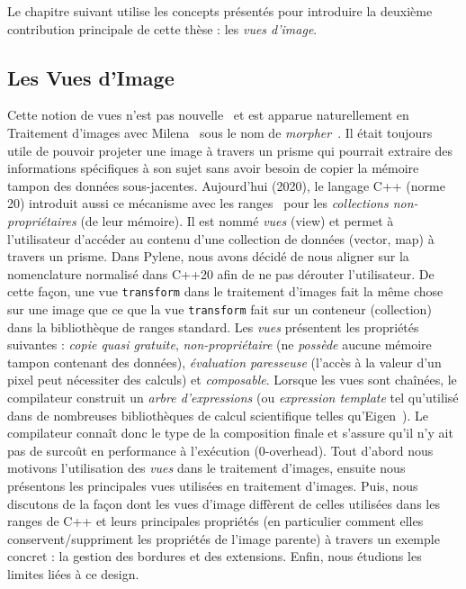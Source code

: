 Le chapitre suivant utilise les concepts présentés pour introduire la deuxième contribution principale de cette thèse :
les \emph{vues d'image}.


\subsection*{Les Vues d'Image}


Cette notion de vues n'est pas nouvelle~\parencite{novak.1997.reuse} et est apparue naturellement en Traitement d'images
avec Milena~\parencite{geraud.2012.ipolmeeting,levillain.2010.icip} sous le nom de
\emph{morpher}~\parencite{levillain.2009.ismm, geraud.2012.hdr}. Il était toujours utile de pouvoir projeter une image à
travers un prisme qui pourrait extraire des informations spécifiques à son sujet sans avoir besoin de copier la mémoire
tampon des données sous-jacentes. Aujourd'hui (2020), le langage C++ (norme 20) introduit aussi ce mécanisme avec les
ranges~\parencite{niebler.2014.ranges} pour les \emph{collections non-propriétaires} (de leur mémoire). Il est nommé
\emph{vues} (view) et permet à l'utilisateur d'accéder au contenu d'une collection de données (vector, map) à travers un
prisme. Dans Pylene, nous avons décidé de nous aligner sur la nomenclature normalisé dans C++20 afin de ne pas dérouter
l'utilisateur. De cette façon, une vue \texttt{transform} dans le traitement d'images fait la même chose sur une image
que ce que la vue \texttt{transform} fait sur un conteneur (collection) dans la bibliothèque de ranges standard. Les
\emph{vues} présentent les propriétés suivantes : \emph{copie quasi gratuite}, \emph{non-propriétaire} (ne
\emph{possède} aucune mémoire tampon contenant des données), \emph{évaluation paresseuse} (l'accès à la valeur d'un
pixel peut nécessiter des calculs) et \emph{composable}. Lorsque les vues sont chaînées, le compilateur construit un
\emph{arbre d'expressions} (ou \emph{expression template} tel qu'utilisé dans de nombreuses bibliothèques de calcul
scientifique telles qu'Eigen~\parencite{guennebaud.2010.eigen}). Le compilateur connaît donc le type de la composition
finale et s'assure qu'il n'y ait pas de surcoût en performance à l'exécution (0-overhead). Tout d'abord nous motivons
l'utilisation des \emph{vues} dans le traitement d'images, ensuite nous présentons les principales vues utilisées en
traitement d'images. Puis, nous discutons de la façon dont les vues d'image diffèrent de celles utilisées dans les
ranges de C++ et leurs principales propriétés (en particulier comment elles conservent/suppriment les propriétés de
l'image parente) à travers un exemple concret : la gestion des bordures et des extensions. Enfin, nous étudions les
limites liées à ce design.

